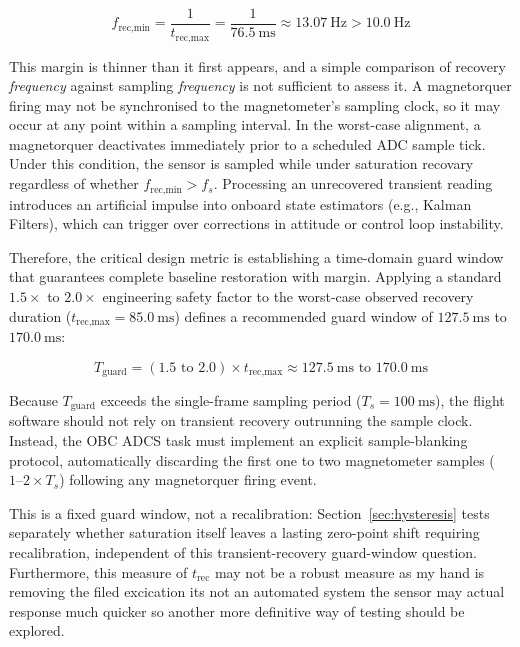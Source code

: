 \documentclass[12pt,a4paper]{article}
\begin{document}
\begin{equation}
    f_{\text{rec,min}} = \frac{1}{t_{\text{rec,max}}} = \frac{1}{\SI{76.5}{\milli\second}} \approx \SI{13.07}\hertz > \SI{10.0}\hertz
\end{equation}
 
This margin is thinner than it first appears, and a simple comparison of recovery \emph{frequency} against sampling \emph{frequency} is not sufficient to assess it. A magnetorquer firing may not be synchronised to the magnetometer's sampling clock, so it may occur at any point within a sampling interval. In the worst-case alignment, a magnetorquer deactivates immediately prior to a scheduled ADC sample tick. Under this condition, the sensor is sampled while under saturation recovary regardless of whether $f_{\text{rec,min}} > f_s$. Processing an unrecovered transient reading introduces an artificial impulse into onboard state estimators (e.g., Kalman Filters), which can trigger over corrections in attitude or control loop instability. 

Therefore, the critical design metric is establishing a time-domain guard window that guarantees complete baseline restoration with margin. Applying a standard $1.5\times$ to $2.0\times$ engineering safety factor to the worst-case observed recovery duration ($t_{\text{rec,max}} = \SI{85.0}{\milli\second}$) defines a recommended guard window of $\SI{127.5}{\milli\second}$ to $\SI{170.0}{\milli\second}$:

\begin{equation}
    T_{\text{guard}} = (1.5 \text{ to } 2.0) \times t_{\text{rec,max}} \approx \SI{127.5}{\milli\second} \text{ to } \SI{170.0}{\milli\second}
\end{equation}

Because $T_{\text{guard}}$ exceeds the single-frame sampling period ($T_s = \SI{100}{\milli\second}$), the flight software should not rely on transient recovery outrunning the sample clock. Instead, the OBC ADCS task must implement an explicit sample-blanking protocol, automatically discarding the first one to two magnetometer samples ($1\text{--}2 \times T_s$) following any magnetorquer firing event. 

This is a fixed guard window, not a recalibration: Section~\ref{sec:hysteresis} tests separately whether saturation itself leaves a lasting zero-point shift requiring recalibration, independent of this transient-recovery guard-window question. Furthermore, this measure of ${t}_{\text{rec}}$ may not be a robust measure as my hand is removing the filed excication its not an automated system the sensor may actual response much quicker so another more definitive way of testing  should be explored.
\end{document}

